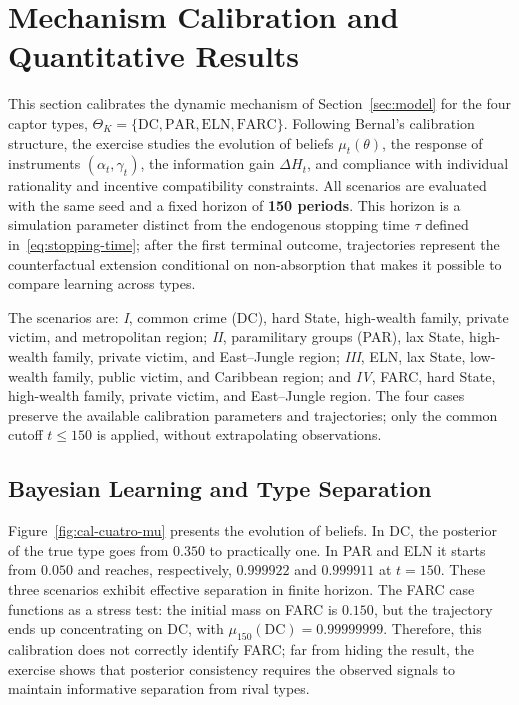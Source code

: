 \documentclass[12pt,a4paper]{article}
\theoremstyle{plain}
\theoremstyle{definition}
\theoremstyle{remark}
\newcommand{\1}{\mathbf{1}}
\begin{document}
\section{Mechanism Calibration and Quantitative Results}
\label{sec:calibracion}

This section calibrates the dynamic mechanism of Section~\ref{sec:model} for the four
captor types, $\Theta_K=\{\mathrm{DC},\mathrm{PAR},\mathrm{ELN},\mathrm{FARC}\}$. Following
Bernal's calibration structure, the exercise studies the evolution of beliefs
$\mu_t(\theta)$, the response of instruments $(\alpha_t,\gamma_t)$, the information gain
$\Delta H_t$, and compliance with individual rationality and incentive compatibility
constraints. All scenarios are evaluated with the same seed and a fixed horizon of
\textbf{150 periods}. This horizon is a simulation parameter distinct from the
endogenous stopping time $\tau$ defined in~\eqref{eq:stopping-time}; after the first
terminal outcome, trajectories represent the counterfactual extension conditional on
non-absorption that makes it possible to compare learning across types.

The scenarios are: \emph{I}, common crime (DC), hard State, high-wealth family, private
victim, and metropolitan region; \emph{II}, paramilitary groups (PAR), lax State,
high-wealth family, private victim, and East--Jungle region; \emph{III}, ELN, lax
State, low-wealth family, public victim, and Caribbean region; and \emph{IV}, FARC,
hard State, high-wealth family, private victim, and East--Jungle region. The four cases
preserve the available calibration parameters and trajectories; only the common cutoff
$t\leq150$ is applied, without extrapolating observations.

\subsection{Bayesian Learning and Type Separation}

Figure~\ref{fig:cal-cuatro-mu} presents the evolution of beliefs. In DC, the posterior
of the true type goes from $0.350$ to practically one. In PAR and ELN it starts from
$0.050$ and reaches, respectively, $0.999922$ and $0.999911$ at $t=150$. These three
scenarios exhibit effective separation in finite horizon. The FARC case functions as a
stress test: the initial mass on FARC is $0.150$, but the trajectory ends up
concentrating on DC, with $\mu_{150}(\mathrm{DC})=0.99999999$. Therefore, this
calibration does not correctly identify FARC; far from hiding the result, the exercise
shows that posterior consistency requires the observed signals to maintain informative
separation from rival types.
\end{document}
